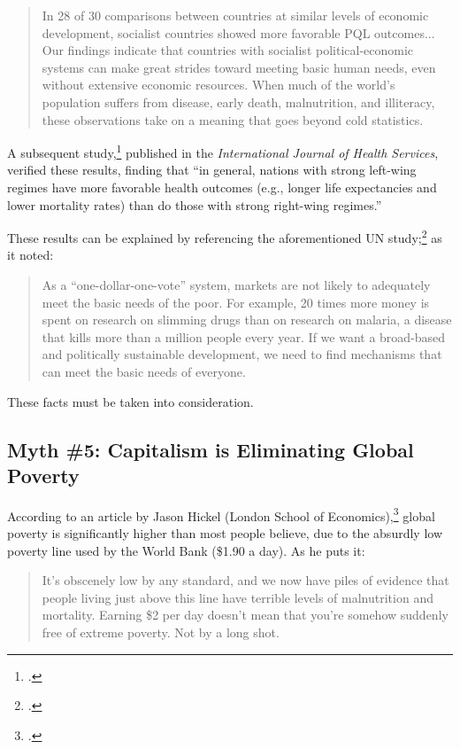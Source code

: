 \begin{quote}
In 28 of 30 comparisons between countries at similar levels of economic development, socialist countries showed more favorable PQL outcomes...
Our findings indicate that countries with socialist political-economic systems can make great strides toward meeting basic human needs, even without extensive economic resources.
When much of the world's population suffers from disease, early death, malnutrition, and illiteracy, these observations take on a meaning that goes beyond cold statistics.
\end{quote}

A subsequent study,\footcite{lena-political} published in the \textit{International Journal of Health Services}, verified these results, finding that ``in general, nations with strong left-wing regimes have more favorable health outcomes (e.g., longer life expectancies and lower mortality rates) than do those with strong right-wing regimes.''

These results can be explained by referencing the aforementioned UN study;\footcite{ha-joon} as it noted:

\begin{quote}
As a ``one-dollar-one-vote'' system, markets are not likely to adequately meet the basic needs of the poor.
For example, 20 times more money is spent on research on slimming drugs than on research on malaria, a disease that kills more than a million people every year.
If we want a broad-based and politically sustainable development, we need to find mechanisms that can meet the basic needs of everyone.
\end{quote}

These facts must be taken into consideration.

\subsection*{Myth \#5: Capitalism is Eliminating Global Poverty}

According to an article by Jason Hickel (London School of Economics),\footcite{hickel-gates} global poverty is significantly higher than most people believe, due to the absurdly low poverty line used by the World Bank (\$1.90 a day). As he puts it:

\begin{quote}
It's obscenely low by any standard, and we now have piles of evidence that people living just above this line have terrible levels of malnutrition and mortality.
Earning \$2 per day doesn't mean that you're somehow suddenly free of extreme poverty.
Not by a long shot.
\end{quote}

